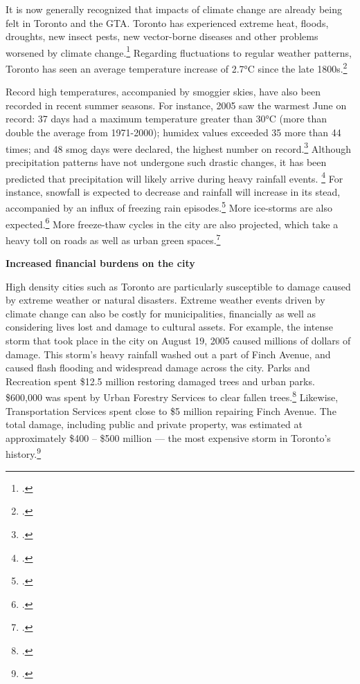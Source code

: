 It is now generally recognized that impacts of climate change are already being felt in Toronto and the GTA.
Toronto has experienced extreme heat, floods, droughts, new insect pests, new vector-borne diseases and other problems worsened by climate change.\footcite[][]{TorontoAheadStorm}
Regarding fluctuations to regular weather patterns, Toronto has seen an average temperature increase of 2.7°C since the late 1800s.\footcite[][p. 5]{ScanCCToronto}



Record high temperatures, accompanied by smoggier skies, have also been recorded in recent summer seasons. 
For instance, 2005 saw the warmest June on record: 37 days had a maximum temperature greater than 30°C (more than double the average from 1971-2000); humidex values exceeded 35 more than 44 times; and 48 smog days were declared, the highest number on record.\footcite[][p. iii, p. 7]{ScanCCToronto}
Although precipitation patterns have not undergone such drastic changes, it has been predicted that precipitation will likely arrive during heavy rainfall events. \footcite[][p. 6]{ScanCCToronto}
For instance, snowfall is expected to decrease and rainfall will increase in its stead, accompanied by an influx of freezing rain episodes.\footcite[][p. 8]{TorontoAheadStorm}
More ice-storms are also expected.\footcite[][]{FreezingRain2007}
More freeze-thaw cycles in the city are also projected, which take a heavy toll on roads as well as urban green spaces.\footcite[][p. 8]{TorontoAheadStorm}



\textbf{Increased financial burdens on the city}



High density cities such as Toronto are particularly susceptible to damage caused by extreme weather or natural disasters. 
Extreme weather events driven by climate change can also be costly for municipalities, financially as well as considering lives lost and damage to cultural assets. 
For example, the intense storm that took place in the city on August 19, 2005 caused millions of dollars of damage. 
This storm's heavy rainfall washed out a part of Finch Avenue, and caused flash flooding and widespread damage across the city. 
Parks and Recreation spent \$12.5 million restoring damaged trees and urban parks. 
\$600,000 was spent by Urban Forestry Services to clear fallen trees.\footcite[][p. iii]{ScanCCToronto}
Likewise, Transportation Services spent close to \$5 million repairing Finch Avenue. 
The total damage, including public and private property, was estimated at approximately \$400 -- \$500 million --- the most expensive storm in Toronto's history.\footcite[][p. 11]{TorontoAheadStorm}



